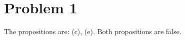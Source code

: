 \section*{Problem 1}
\begin{sol}
    The propositions are: (c), (e). Both propositions are false.   
\end{sol}
\newpage